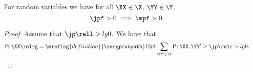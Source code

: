 \begin{proposition}

  For random variables 
  we have for all $\XX \in \X$, $\YY \in \Y$,
  $$\jpf > 0 \implies \mpf > 0.$$%
\end{proposition}

\begin{proof}
  Assume that $\jp \rell > lg 0.$
  We have that
  $$\Pr{\XX} \relrg = \mreflng{definition}{\margprobpath} 12pt \sum_{\YY' \in \Y}\Pr{\XX, \YY'} \ge \jp \relr > lg 0.$$%
\end{proof}

